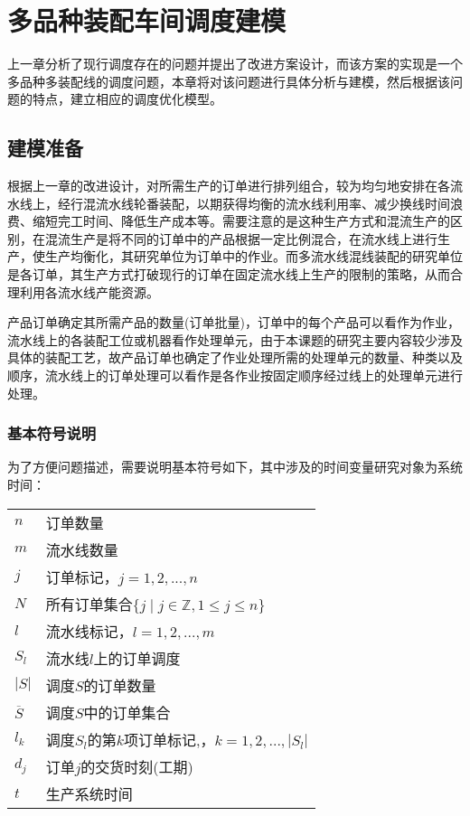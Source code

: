 \chapter{多品种装配车间调度建模}
上一章分析了现行调度存在的问题并提出了改进方案设计，而该方案的实现是一个多品种多装配线的调度问题，本章将对该问题进行具体分析与建模，然后根据该问题的特点，建立相应的调度优化模型。

\section{建模准备}

根据上一章的改进设计，对所需生产的订单进行排列组合，较为均匀地安排在各流水线上，经行混流水线轮番装配，以期获得均衡的流水线利用率、减少换线时间浪费、缩短完工时间、降低生产成本等。需要注意的是这种生产方式和混流生产的区别，在混流生产是将不同的订单中的产品根据一定比例混合，在流水线上进行生产，使生产均衡化，其研究单位为订单中的作业。而多流水线混线装配的研究单位是各订单，其生产方式打破现行的订单在固定流水线上生产的限制的策略，从而合理利用各流水线产能资源。

产品订单确定其所需产品的数量(订单批量)，订单中的每个产品可以看作为作业，流水线上的各装配工位或机器看作处理单元，由于本课题的研究主要内容较少涉及具体的装配工艺，故产品订单也确定了作业处理所需的处理单元的数量、种类以及顺序，流水线上的订单处理可以看作是各作业按固定顺序经过线上的处理单元进行处理。

\subsection{基本符号说明}
为了方便问题描述，需要说明基本符号如下，其中涉及的时间变量研究对象为系统时间：\\[3pt]
\begin{supertabular}{ll}
$n$ & 订单数量\\
$m$ & 流水线数量\\
$j$ & 订单标记，$j = 1,2,...,n$\\
$N$ & 所有订单集合$\{ j\mid j \in \mathbb{Z}, 1\le j \le n  \}$\\
$l$ & 流水线标记，$l = 1,2,...,m$\\
$S_l$ & 流水线$l$上的订单调度\\
$|S|$ & 调度$S$的订单数量\\
$\overline S$ & 调度$S$中的订单集合\\
$l_k$ & 调度$S_l$的第$k$项订单标记,，$k = 1,2,...,|S_l|$\\
$d_j$ & 订单$j$的交货时刻(工期)\\
$t$ & 生产系统时间\\[3pt]
\end{supertabular}

